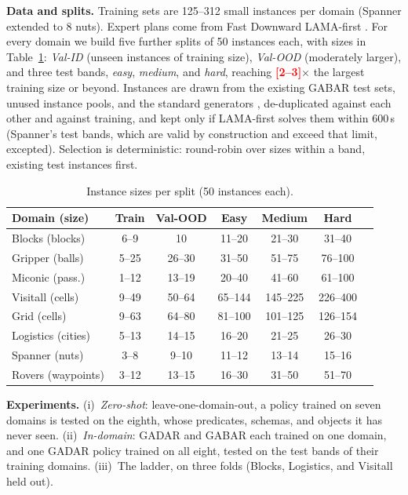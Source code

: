 \documentclass[letterpaper]{article} %
\newcommand{\gadar}{GADAR}                    %
\newcommand{\todonum}[1]{\textcolor{red}{\textbf{[#1]}}}
\begin{document}
\textbf{Data and splits.} Training sets are 125--312 small instances per
domain (Spanner extended to 8 nuts). Expert plans come from Fast Downward
LAMA-first \citep{fast_downward}. For every domain we build five further
splits of 50 instances each, with sizes in Table~\ref{table:splits}:
\emph{Val-ID} (unseen instances of training size), \emph{Val-OOD}
(moderately larger), and three test bands, \emph{easy}, \emph{medium}, and
\emph{hard}, reaching \todonum{2--3}$\times$ the largest training size or
beyond. Instances are drawn from the existing GABAR test sets, unused
instance pools, and the standard generators \citep{pddl-generators},
de-duplicated against each other and against training, and kept only if
LAMA-first solves them within 600\,s (Spanner's test bands, which are valid
by construction and exceed that limit, excepted). Selection is
deterministic: round-robin over sizes within a band, existing test
instances first.

\begin{table}[t]
\centering
\small
\caption{Instance sizes per split (50 instances each).}
\label{table:splits}
\setlength{\tabcolsep}{3pt}
\begin{tabular}{@{}lcccccc@{}}
\toprule
Domain (size) & Train & Val-OOD & Easy & Medium & Hard \\
\midrule
Blocks (blocks) & 6--9 & 10 & 11--20 & 21--30 & 31--40 \\
Gripper (balls) & 5--25 & 26--30 & 31--50 & 51--75 & 76--100 \\
Miconic (pass.) & 1--12 & 13--19 & 20--40 & 41--60 & 61--100 \\
Visitall (cells) & 9--49 & 50--64 & 65--144 & 145--225 & 226--400 \\
Grid (cells) & 9--63 & 64--80 & 81--100 & 101--125 & 126--154 \\
Logistics (cities) & 5--13 & 14--15 & 16--20 & 21--25 & 26--30 \\
Spanner (nuts) & 3--8 & 9--10 & 11--12 & 13--14 & 15--16 \\
Rovers (waypoints) & 3--12 & 13--15 & 16--30 & 31--50 & 51--70 \\
\bottomrule
\end{tabular}
\end{table}

\textbf{Experiments.} (i)~\emph{Zero-shot}: leave-one-domain-out, a policy
trained on seven domains is tested on the eighth, whose predicates,
schemas, and objects it has never seen. (ii)~\emph{In-domain}: \gadar{} and
GABAR each trained on one domain, and one \gadar{} policy trained on all
eight, tested on the test bands of their training domains. (iii)~The
ladder, on three folds (Blocks, Logistics, and Visitall held out).
\end{document}
